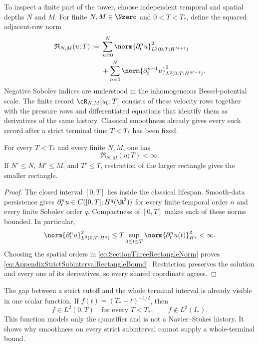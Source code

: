 To inspect a finite part of the tower, choose independent temporal and spatial depths \(N\) and \(M\).
For finite \(N,M\in\Nzero\) and \(0<T<T_*\), define the squared adjacent-row norm
\begin{equation}\label{eq:SectionThreeRectangleNorm}
\begin{aligned}
  \mathfrak R_{N,M}(u;T)
  :={}&
  \sum_{n=0}^{N}
  \norm{\partial_t^n u}_{L^2(0,T;H^{M+1})}^{2}
  \\
  &+
  \sum_{n=0}^{N}
  \norm{\partial_t^{n+1}u}_{L^2(0,T;H^{M-1})}^{2}.
\end{aligned}
\end{equation}
Negative Sobolev indices are understood in the inhomogeneous Bessel-potential scale.
The finite record \(\cR_{N,M}[u_0;T]\) consists of these velocity rows together with the pressure rows and differentiated equations that identify them as derivatives of the same history.
Classical smoothness already gives every such record after a strict terminal time \(T<T_*\) has been fixed.

\begin{lemma}\label{lem:StrictSubintervalRectangles}
For every \(T<T_*\) and every finite \(N,M\), one has
\begin{equation}\label{eq:AppendixStrictSubintervalRectangleBound}
  \mathfrak R_{N,M}(u;T)<\infty.
\end{equation}
If \(N'\leq N\), \(M'\leq M\), and \(T'\leq T\), restriction of the larger rectangle gives the smaller rectangle.
\end{lemma}

\begin{proof}
The closed interval \([0,T]\) lies inside the classical lifespan.
Smooth-data persistence gives \(\partial_t^n u\in C([0,T];H^q(\R^3))\) for every finite temporal order \(n\) and every finite Sobolev order \(q\).
Compactness of \([0,T]\) makes each of these norms bounded.
In particular,
\[
  \norm{\partial_t^n u}_{L^2(0,T;H^q)}^2
  \leq
  T\sup_{0\leq t\leq T}
  \norm{\partial_t^n u(t)}_{H^q}^{2}
  <\infty.
\]
Choosing the spatial orders in \eqref{eq:SectionThreeRectangleNorm} proves \eqref{eq:AppendixStrictSubintervalRectangleBound}.
Restriction preserves the solution and every one of its derivatives, so every shared coordinate agrees.
\end{proof}

The gap between a strict cutoff and the whole terminal interval is already visible in one scalar function.
If \(f(t)=(T_*-t)^{-1/2}\), then
\[
  f\in L^2(0,T)\quad\text{for every }T<T_*,
  \qquad
  f\notin L^2(I_*).
\]
This function models only the quantifier and is not a Navier--Stokes history.
It shows why smoothness on every strict subinterval cannot supply a whole-terminal bound.

